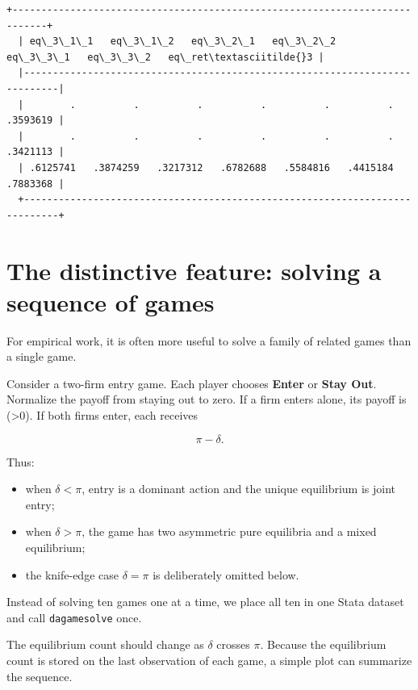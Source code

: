 \documentclass[11pt]{article}
\providecommand{\tightlist}{%
      \setlength{\itemsep}{0pt}\setlength{\parskip}{0pt}}
\begin{document}
\begin{Verbatim}[commandchars=\\\{\}]
  +----------------------------------------------------------------------------+
  | eq\_3\_1\_1   eq\_3\_1\_2   eq\_3\_2\_1   eq\_3\_2\_2   eq\_3\_3\_1   eq\_3\_3\_2   eq\_ret\textasciitilde{}3 |
  |----------------------------------------------------------------------------|
  |        .          .          .          .          .          .   .3593619 |
  |        .          .          .          .          .          .   .3421113 |
  | .6125741   .3874259   .3217312   .6782688   .5584816   .4415184   .7883368 |
  +----------------------------------------------------------------------------+
    \end{Verbatim}

    \section{The distinctive feature: solving a sequence of
games}\label{the-distinctive-feature-solving-a-sequence-of-games}

For empirical work, it is often more useful to solve a family of related
games than a single game.

Consider a two-firm entry game. Each player chooses \textbf{Enter} or
\textbf{Stay Out}. Normalize the payoff from staying out to zero. If a
firm enters alone, its payoff is (\pi\textgreater0). If both firms
enter, each receives

\[
\pi-\delta.
\]

Thus:

\begin{itemize}
\tightlist
\item
  when \(\delta<\pi\), entry is a dominant action and the unique
  equilibrium is joint entry;
\item
  when \(\delta>\pi\), the game has two asymmetric pure equilibria and a
  mixed equilibrium;
\item
  the knife-edge case \(\delta=\pi\) is deliberately omitted below.
\end{itemize}

Instead of solving ten games one at a time, we place all ten in one
Stata dataset and call \texttt{dagamesolve} once.

    The equilibrium count should change as \(\delta\) crosses \(\pi\).
Because the equilibrium count is stored on the last observation of each
game, a simple plot can summarize the sequence.
\end{document}
